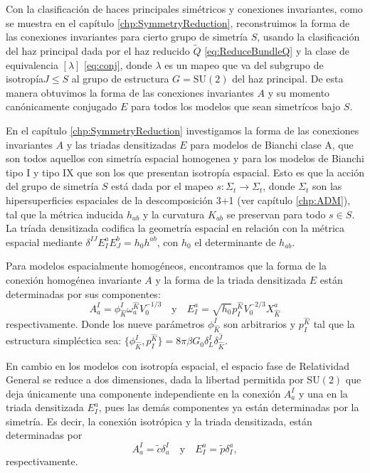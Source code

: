 Con la clasificaci\'{o}n de haces principales sim\'{e}tricos y conexiones invariantes, como se muestra en el cap\'{i}tulo \ref{chp:SymmetryReduction}, reconstruimos la forma de las conexiones invariantes para cierto grupo de simetr\'{i}a $S$, usando la clasificaci\'{o}n del haz principal dada por el haz reducido $\tilde{Q}$ \eqref{eq:ReduceBundleQ} y la clase de equivalencia $[\lambda]$ \eqref{eq:conj}, donde $\lambda$ es un mapeo que va del subgrupo de isotrop\'{i}a\footnotemark $J \leq S$ al grupo de estructura $G = \mathrm{SU}(2)$ del haz principal. De esta manera obtuvimos la forma de las conexiones invariantes $A$ y su momento can\'{o}nicamente conjugado $E$ para todos los modelos que sean simetr\'{i}cos bajo $S$.

En el cap\'{i}tulo \ref{chp:SymmetryReduction} investigamos la forma de las conexiones invariantes $A$ y las triadas densitizadas $E$ para modelos de Bianchi clase A, que son todos aquellos con simetr\'{i}a espacial homogenea y para los modelos de Bianchi tipo I y tipo IX que son los que presentan isotrop\'{i}a espacial. Esto es que la acci\'{o}n del grupo de simetr\'{i}a $S$ est\'{a} dada por el mapeo $s: \Sigma_{t} \longrightarrow \Sigma_{t}$, donde $\Sigma_{t}$ son las hipersuperficies espaciales de la descomposici\'{o}n 3+1 (ver cap\'{i}tulo \ref{chp:ADM}), tal que la m\'{e}trica inducida $h_{ab}$ y la curvatura $K_{ab}$ se preservan para todo $s \in S$. La tr\'{i}ada densitizada codifica la geometr\'{i}a espacial en relaci\'{o}n con la m\'{e}trica espacial mediante $\delta^{IJ} E^{a}_{I} E^{b}_{J} = h_{0} h^{ab}$, con $h_{0}$ el determinante de $h_{ab}$.

Para modelos espacialmente homog\'{e}neos, encontramos que la forma de la conexi\'{o}n homog\'{e}nea invariante $A$ y la forma de la triada densitizada $E$ est\'{a}n determinadas por sus componentes:
%
\begin{equation*}
A^{I}_{a} = \phi^{I}_{\hat{K}} \omega^{\hat{K}}_{a} V^{-1/3}_{0} \quad \mathrm{y} \quad E^{a}_{I} = \sqrt{h_{0}} p^{\hat{K}}_{I} V^{-2/3}_{0} X^{a}_{\hat{K}}
\end{equation*}
%
respectivamente. Donde los nueve par\'{a}metros $\phi^{I}_{\hat{K}}$ son arbitrarios y $p^{\hat{K}}_{I}$ tal que la estructura simpl\'{e}ctica sea: $\{\phi^{I}_{\hat{K}}, p^{\hat{K}}_{I}\} = 8 \pi \beta G_{0} \delta^{I}_{L} \delta^{\hat{J}}_{\hat{K}}$.

En cambio en los modelos con isotrop\'{i}a espacial, el espacio fase de Relatividad General se reduce a dos dimensiones, dada la libertad permitida por $\mathrm{SU}(2)$ que deja \'{u}nicamente una componente independiente en la conexi\'{o}n $A^{I}_{a}$ y una en la triada densitizada $E^{a}_{I}$, pues las dem\'{a}s componentes ya est\'{a}n determinadas por la simetr\'{i}a. Es decir, la conexi\'{o}n isotr\'{o}pica y la triada densitizada, est\'{a}n determinadas por
%
\begin{equation*}
A^{I}_{a} = \tilde{c} \delta^{I}_{a} \quad \mathrm{y} \quad E^{a}_{I} = \tilde{p} \delta^{a}_{I},
\end{equation*}
%
respectivamente.

